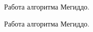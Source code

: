 \documentclass[12pt,a4paper]{article}
\begin{document}
\newpage
\begin{figure}[h!]
\caption{Работа алгоритма Мегиддо.}
\label{ris:Meg}
\end{figure}


\begin{figure}[h!]
\caption{Работа алгоритма Мегиддо.}
\label{ris:Meg2}
\end{figure}


\newpage
\end{document}
